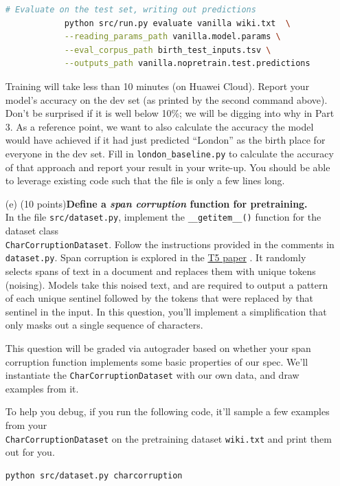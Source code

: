 \documentclass[letterpaper,12pt]{article}
\begin{document}
\begin{itemize}
\begin{lstlisting}[language=bash, basicstyle=\small\ttfamily]
			# Evaluate on the test set, writing out predictions
			python src/run.py evaluate vanilla wiki.txt  \
			--reading_params_path vanilla.model.params \
			--eval_corpus_path birth_test_inputs.tsv \
			--outputs_path vanilla.nopretrain.test.predictions
		\end{lstlisting}
		
		Training will take less than 10 minutes (on Huawei Cloud).  Report your model's accuracy on the dev set (as printed by the second command above). Don't be surprised if it is well below 10\%; we will be digging into why in Part 3. As a reference point, we want to also calculate the accuracy the model would have achieved if it had just predicted ``London'' as the birth place for everyone in the dev set. Fill in \texttt{london\_baseline.py} to calculate the accuracy of that approach and report your result in your write-up. You should be able to leverage existing code such that the file is only a few lines long. 
		
	\item[(e)]
		(10 points)\textbf{Define a \textit{span corruption} function for pretraining.}\\
		In the file \texttt{src/dataset.py}, implement the \texttt{\_\_getitem\_\_()} function for the dataset class \\ \texttt{CharCorruptionDataset}.
		Follow the instructions provided in the comments in \texttt{dataset.py}.
		Span corruption is explored in the \href{https://arxiv.org/pdf/1910.10683.pdf}{T5 paper} \cite{b2}.
		It randomly selects spans of text in a document and replaces them with unique tokens (noising).
		Models take this noised text, and are required to output a pattern of each unique sentinel followed by the tokens that were replaced by that sentinel in the input.
		In this question, you'll implement a simplification that only masks out a single sequence of characters.
		
		This question will be graded via autograder based on whether your span corruption function implements some basic properties of our spec.
		We'll instantiate the \texttt{CharCorruptionDataset} with our own data, and draw examples from it.
		
		To help you debug, if you run the following code, it'll sample a few examples from your \\ \texttt{CharCorruptionDataset} on the pretraining dataset \texttt{wiki.txt} and print them out for you.
		\begin{lstlisting}[language=bash]
			python src/dataset.py charcorruption
		\end{lstlisting}
		

\end{itemize}
\end{document}

